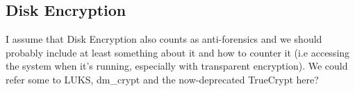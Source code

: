 \subsection{Disk Encryption} %


I assume that Disk Encryption also counts as anti-forensics and we should probably include at least something about it and how to counter it (i.e accessing the system when it's running, especially with transparent encryption). We could refer some to LUKS, dm\_crypt and the now-deprecated TrueCrypt here?